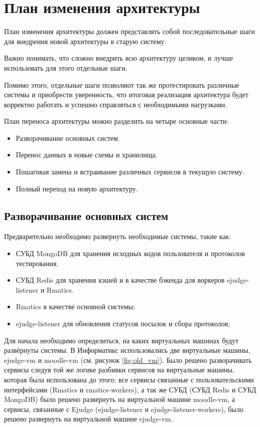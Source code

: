 \section{План изменения архитектуры}

План изменения архитектуры должен представлять собой 
последовательные шаги для внедрения новой архитектуры в старую систему.

Важно понимать, что сложно внедрить всю архитектуру целиком, и лучше использовать для этого отдельные шаги.

Помимо этого, отдельные шаги позволяют так же протестировать различные системы и приобрести уверенность, 
что итоговая реализация архитектура будет корректно работать и успешно справляться с необходимыми нагрузками.

План переноса архитектуры можно разделить на четыре основные части:

\begin{itemize}
    \item Разворачивание основных систем.
    \item Перенос данных в новые схемы и хранилища.
    \item Пошаговая замена и встраивание различных сервисов в текущую систему.
    \item Полный переход на новую архитектуру.
\end{itemize}

\subsection{Разворачивание основных систем}

Предварительно необходимо развернуть необходимые системы, такие как:

\begin{itemize}
    \item СУБД MongoDB для хранения исходных кодов пользователя и протоколов тестирования.
    \item СУБД Redis для хранения кэшей и в качестве бэкенда для воркеров ejudge-listener и Rmatics.
    \item Rmatics в качестве основной системы;
    \item ejudge-listener для обновления статусов посылок и сбора протоколов;
\end{itemize}

Для начала необходимо определиться, 
на каких виртуальных машинах будут развёрнуты системы.
В Информатикс использовались две виртуальные машины, ejudge-vm и moodle-vm (см. рисунок \ref{fig:old_vm}).
Было решено разворачивать сервисы следуя той же логике разбивки сервисов на виртуальные машины, которая была использована до этого: 
все сервисы связанные с пользовательскими интерфейсами (Rmatics и rmatics-workers), 
а так же СУБД (СУБД Redis и СУБД MongoDB) было решено развернуть на виртуальной машине moodle-vm,
а сервисы, связанные с Ejudge (ejudge-listener и ejudge-listener-workers),
было решено развернуть на виртуальной машине ejudge-vm.

